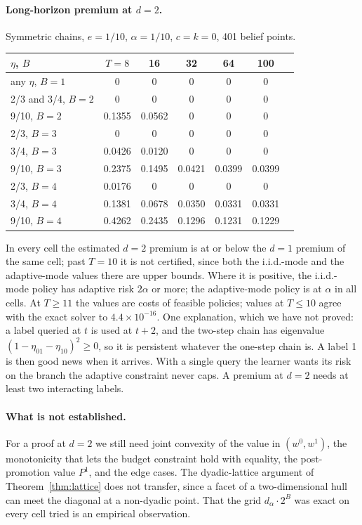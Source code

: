 \paragraph{Long-horizon premium at $d=2$.} Symmetric chains, $e=1/10$, $\alpha=1/10$, $c=k=0$, 401 belief points.
\begin{center}
\small
\begin{tabular}{lcccccc}
\toprule
$\eta$, $B$ & $T=8$ & 16 & 32 & 64 & 100\\
\midrule
any $\eta$, $B=1$ & 0 & 0 & 0 & 0 & 0\\
2/3 and 3/4, $B=2$ & 0 & 0 & 0 & 0 & 0\\
9/10, $B=2$ & 0.1355 & 0.0562 & 0 & 0 & 0\\
2/3, $B=3$ & 0 & 0 & 0 & 0 & 0\\
3/4, $B=3$ & 0.0426 & 0.0120 & 0 & 0 & 0\\
9/10, $B=3$ & 0.2375 & 0.1495 & 0.0421 & 0.0399 & 0.0399\\
2/3, $B=4$ & 0.0176 & 0 & 0 & 0 & 0\\
3/4, $B=4$ & 0.1381 & 0.0678 & 0.0350 & 0.0331 & 0.0331\\
9/10, $B=4$ & 0.4262 & 0.2435 & 0.1296 & 0.1231 & 0.1229\\
\bottomrule
\end{tabular}
\end{center}
In every cell the estimated $d=2$ premium is at or below the $d=1$ premium of the same cell; past $T=10$ it is not certified, since both the i.i.d.-mode and the adaptive-mode values there are upper bounds. Where it is positive, the i.i.d.-mode policy has adaptive risk $2\alpha$ or more; the adaptive-mode policy is at $\alpha$ in all cells. At $T\ge11$ the values are costs of feasible policies; values at $T\le10$ agree with the exact solver to $4.4\times10^{-16}$. One explanation, which we have not proved: a label queried at $t$ is used at $t+2$, and the two-step chain has eigenvalue $(1-\eta_{01}-\eta_{10})^2\ge0$, so it is persistent whatever the one-step chain is. A label 1 is then good news when it arrives. With a single query the learner wants its risk on the branch the adaptive constraint never caps. A premium at $d=2$ needs at least two interacting labels.

\paragraph{What is not established.} For a proof at $d=2$ we still need joint convexity of the value in $(w^0,w^1)$, the monotonicity that lets the budget constraint hold with equality, the post-promotion value $P^1$, and the edge cases. The dyadic-lattice argument of Theorem~\ref{thm:lattice} does not transfer, since a facet of a two-dimensional hull can meet the diagonal at a non-dyadic point. That the grid $d_\alpha\cdot2^B$ was exact on every cell tried is an empirical observation.
